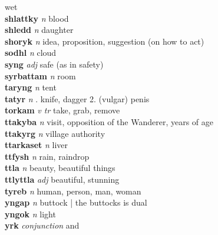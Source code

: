 \textperiodcentered wet\\\textbf{shlattky}   \emph{n} \textperiodcentered blood\\\textbf{shledd}   \emph{n} \textperiodcentered daughter\\\textbf{shoryk}   \emph{n} \textperiodcentered idea, proposition, suggestion (on how to act)\\\textbf{sodhl}   \emph{n} \textperiodcentered cloud\\\textbf{syng}   \emph{adj} \textperiodcentered safe (as in safety)\\\textbf{syrbattam}   \emph{n} \textperiodcentered room\\\textbf{taryng}   \emph{n} \textperiodcentered tent\\\textbf{tatyr}   \emph{n} . knife, dagger 2. (vulgar) penis \\\textbf{torkam}   \emph{v tr} \textperiodcentered take, grab, remove\\\textbf{ttakyba}   \emph{n} \textperiodcentered visit, opposition of the Wanderer, years of age\\\textbf{ttakyrg}   \emph{n} \textperiodcentered village authority\\\textbf{ttarkaset}   \emph{n} \textperiodcentered liver\\\textbf{ttfysh}   \emph{n} \textperiodcentered rain, raindrop\\\textbf{ttla}   \emph{n} \textperiodcentered beauty, beautiful things\\\textbf{ttlyttla}   \emph{adj} \textperiodcentered beautiful, stunning\\\textbf{tyreb}   \emph{n} \textperiodcentered human, person, man, woman\\\textbf{yngap}   \emph{n} \textperiodcentered buttock | the buttocks is dual\\\textbf{yngok}   \emph{n} \textperiodcentered light\\\textbf{yrk}   \emph{conjunction} \textperiodcentered and\\